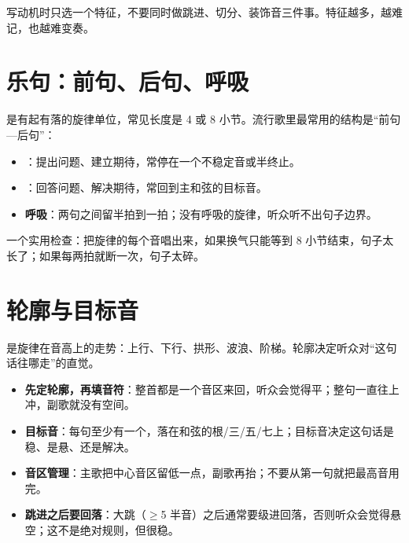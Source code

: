 写动机时只选一个特征，不要同时做跳进、切分、装饰音三件事。特征越多，越难记，也越难变奏。

\section{乐句：前句、后句、呼吸}
\label{sec:phrase}

是有起有落的旋律单位，常见长度是 4 或 8 小节。流行歌里最常用的结构是“前句—后句”：

\begin{itemize}
\item \textbf{}：提出问题、建立期待，常停在一个不稳定音或半终止。
\item \textbf{}：回答问题、解决期待，常回到主和弦的目标音。
\item \textbf{呼吸}：两句之间留半拍到一拍；没有呼吸的旋律，听众听不出句子边界。
\end{itemize}

一个实用检查：把旋律的每个音唱出来，如果换气只能等到 8 小节结束，句子太长了；如果每两拍就断一次，句子太碎。

\section{轮廓与目标音}
\label{sec:contour}

是旋律在音高上的走势：上行、下行、拱形、波浪、阶梯。轮廓决定听众对“这句话往哪走”的直觉。

\begin{itemize}
\item \textbf{先定轮廓，再填音符}：整首都是一个音区来回，听众会觉得平；整句一直往上冲，副歌就没有空间。
\item \textbf{目标音}：每句至少有一个，落在和弦的根/三/五/七上；目标音决定这句话是稳、是悬、还是解决。
\item \textbf{音区管理}：主歌把中心音区留低一点，副歌再抬；不要从第一句就把最高音用完。
\item \textbf{跳进之后要回落}：大跳（$\geq$5 半音）之后通常要级进回落，否则听众会觉得悬空；这不是绝对规则，但很稳。
\end{itemize}

